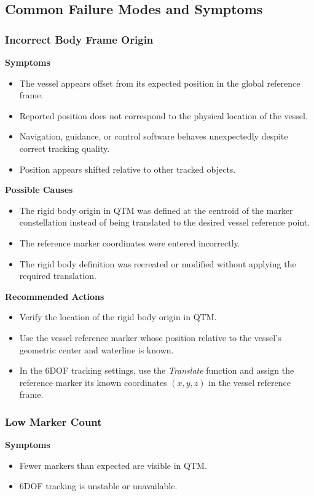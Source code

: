 \documentclass[12pt,a4paper]{article}
\begin{document}
	\subsection{Common Failure Modes and Symptoms}
	\subsubsection{Incorrect Body Frame Origin}
	\textbf{Symptoms}
	\begin{itemize}
		\item The vessel appears offset from its expected position in the global reference frame.
		\item Reported position does not correspond to the physical location of the vessel.
		\item Navigation, guidance, or control software behaves unexpectedly despite correct tracking quality.
		\item Position appears shifted relative to other tracked objects.
	\end{itemize}
	
	\textbf{Possible Causes}
	\begin{itemize}
		\item The rigid body origin in QTM was defined at the centroid of the marker constellation instead of being translated to the desired vessel reference point.
		\item The reference marker coordinates were entered incorrectly.
		\item The rigid body definition was recreated or modified without applying the required translation.
	\end{itemize}
	
	\textbf{Recommended Actions}
	\begin{itemize}
		\item Verify the location of the rigid body origin in QTM.
		\item Use the vessel reference marker whose position relative to the vessel's geometric center and waterline is known.
		\item In the 6DOF tracking settings, use the \emph{Translate} function and assign the reference marker its known coordinates $(x,y,z)$ in the vessel reference frame.
	\end{itemize}
	\subsubsection{Low Marker Count}
	
	\textbf{Symptoms}
	\begin{itemize}
		\item Fewer markers than expected are visible in QTM.
		\item 6DOF tracking is unstable or unavailable.
	\end{itemize}
	
\end{document}
